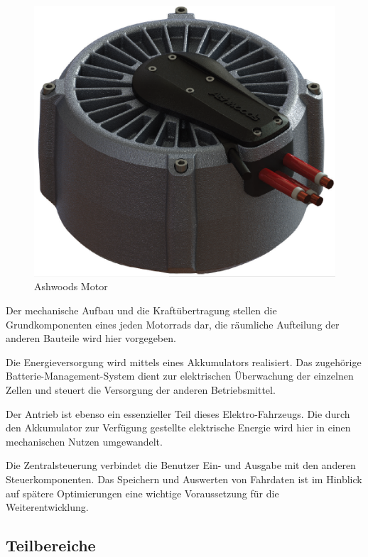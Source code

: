 \begin{figure}[H]
	\begin{center}
		\includegraphics[scale=0.5]{figures/allgemein/Ashwoods_Motor.png}
		\caption{Ashwoods Motor}
	\end{center}
\end{figure}

Der mechanische Aufbau und die Kraftübertragung stellen die Grundkomponenten eines jeden Motorrads dar, die räumliche Aufteilung der anderen Bauteile wird hier vorgegeben. 

Die Energieversorgung wird mittels eines Akkumulators realisiert. Das zugehörige Batterie-Management-System dient zur elektrischen Überwachung der einzelnen Zellen und steuert die Versorgung der anderen Betriebsmittel.

Der Antrieb ist ebenso ein essenzieller Teil dieses Elektro-Fahrzeugs. Die durch den Akkumulator zur Verfügung gestellte elektrische Energie wird hier in einen mechanischen Nutzen umgewandelt.

Die Zentralsteuerung verbindet die Benutzer Ein- und Ausgabe mit den anderen Steuerkomponenten. Das Speichern und Auswerten von Fahrdaten ist im Hinblick auf spätere Optimierungen eine wichtige Voraussetzung für die Weiterentwicklung.

\subsection{Teilbereiche}

